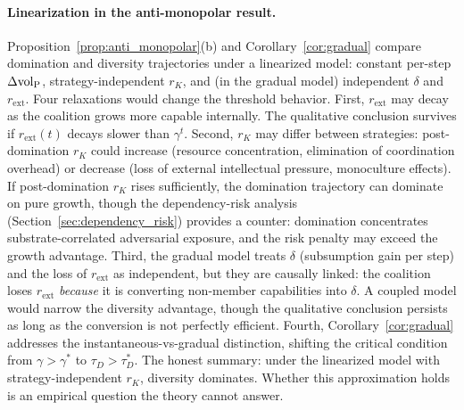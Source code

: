 \paragraph{Linearization in the anti-monopolar result.}
Proposition~\ref{prop:anti_monopolar}(b) and Corollary~\ref{cor:gradual}
compare domination and diversity trajectories under a linearized model:
constant per-step $\Delta{\operatorname{vol}_{\mathrm{P}}}$, strategy-independent $r_K$, and (in the
gradual model) independent $\delta$ and $r_{\mathrm{ext}}$. Four
relaxations would change the threshold behavior. First,
$r_{\mathrm{ext}}$ may decay as the coalition grows more capable internally.
The qualitative conclusion survives if $r_{\mathrm{ext}}(t)$ decays slower
than $\gamma^t$. Second, $r_K$ may differ between strategies:
post-domination $r_K$ could increase (resource concentration, elimination of
coordination overhead) or decrease (loss of external intellectual pressure,
monoculture effects). If post-domination $r_K$ rises sufficiently, the
domination trajectory can dominate on pure growth, though the
dependency-risk analysis (Section~\ref{sec:dependency_risk}) provides a
counter: domination concentrates substrate-correlated adversarial exposure,
and the risk penalty may exceed the growth advantage.
Third, the gradual model treats $\delta$ (subsumption gain per step) and the
loss of $r_{\mathrm{ext}}$ as independent, but they are causally linked: the
coalition loses $r_{\mathrm{ext}}$ \emph{because} it is converting
non-member capabilities into $\delta$. A coupled model would narrow the
diversity advantage, though the qualitative conclusion persists as long as
the conversion is not perfectly efficient. Fourth,
Corollary~\ref{cor:gradual} addresses the instantaneous-vs-gradual
distinction, shifting the critical condition from $\gamma > \gamma^*$ to
$\tau_D > \tau_D^*$. The honest summary: under the linearized model with
strategy-independent $r_K$, diversity dominates. Whether this approximation
holds is an empirical question the theory cannot answer.


